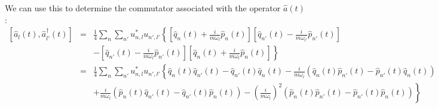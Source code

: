 \documentclass{article}
\begin{document}
We can use this to determine the commutator associated with the operator $\hat{a}(t)$:
\begin{eqnarray*}
       \left [ \hat{a}_l (t), \hat{a}^\dagger _{l'}(t) \right ] &=&   \frac{1}{4} \sum_n \sum_{n'} u^* _{n,l} u_{n',l'} \left \{  \left[ \hat{q}_n(t) + \frac{i}{m\omega_l}\hat{p}_n (t) \right] \left[ \hat{q}_{n'}(t) - \frac{i}{m\omega_{l'}}\hat{p}_{n'}(t) \right] \right. \\
       && \left. - \left[ \hat{q}_{n'}(t) - \frac{i}{m\omega_{l}}\hat{p}_{n'}(t) \right]\left[ \hat{q}_n(t) + \frac{i}{m\omega_l}\hat{p}_n (t) \right] \right \} \\
       &=& \frac{1}{4} \sum_n \sum_{n'}u^* _{n,l} u_{n',l'} \left \{ \hat{q}_n (t)\hat{q}_{n'} (t) - \hat{q}_{n'} (t) \hat{q}_n (t)  - \frac{i}{m\omega_l} \left( \hat{q}_n (t)\hat{p}_{n'} (t) - \hat{p}_{n'}(t) \hat{q}_n (t) \right) \right. \\
       && \left. + \frac{i}{m\omega_l} \left( \hat{p}_n (t)\hat{q}_{n'} (t) - \hat{q}_{n'}(t) \hat{p}_n (t) \right)  -\left(\frac{i}{m\omega_l}\right)^2 \left( \hat{p}_n (t)\hat{p}_{n'} (t) - \hat{p}_{n'}(t) \hat{p}_n (t) \right) \right \}
\end{eqnarray*}
\end{document}
